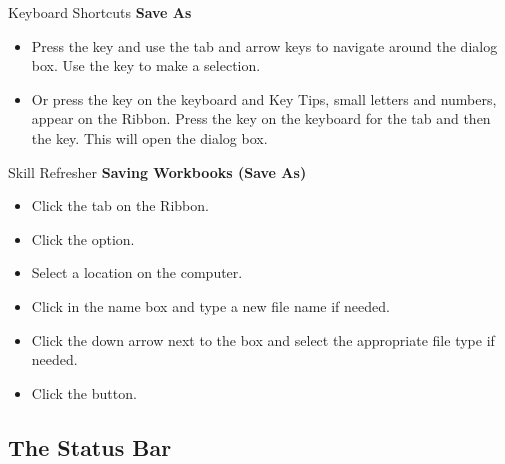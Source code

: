 \begin{center}
	\begin{shtcutbox}{Keyboard Shortcuts}
		\textbf{Save As}
		\\
		\begin{itemize}
			\setlength{\itemsep}{0pt}
			\setlength{\parskip}{0pt}
			\setlength{\parsep}{0pt}
			
			\item Press the  key and use the tab and arrow keys to navigate around the  dialog box. Use the  key to make a selection.
			\item Or press the  key on the keyboard and Key Tips, small letters and numbers, appear on the Ribbon. Press the  key on the keyboard for the  tab and then the  key. This will open the  dialog box.
			
		\end{itemize}
	\end{shtcutbox}
\end{center}

\begin{center}
	\begin{sklbox}{Skill Refresher}
		\textbf{Saving Workbooks (Save As)}
		\\
		\begin{itemize}
			\setlength{\itemsep}{0pt}
			\setlength{\parskip}{0pt}
			\setlength{\parsep}{0pt}
			
			\item Click the  tab on the Ribbon.
			\item Click the  option.
			\item Select a location on the computer.
			\item Click in the  name box and type a new file name if needed.
			\item Click the down arrow next to the  box and select the appropriate file type if needed.
			\item Click the  button.
		
		\end{itemize}
	\end{sklbox}
\end{center}

\subsection{The Status Bar}

